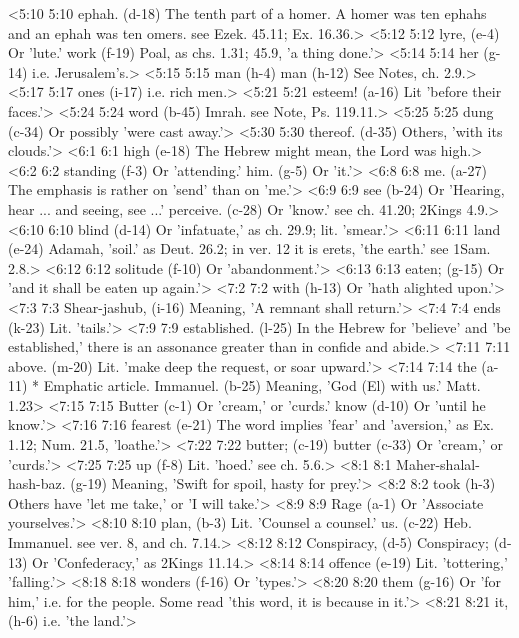<5:10 5:10  ephah. (d-18)  The tenth part of a homer. A homer was ten ephahs and an  ephah was ten omers. see Ezek. 45.11; Ex. 16.36.>
<5:12 5:12  lyre, (e-4)  Or 'lute.'  work (f-19)  Poal, as chs. 1.31; 45.9, 'a thing done.'>
<5:14 5:14  her (g-14)  i.e. Jerusalem's.>
<5:15 5:15  man (h-4)  man (h-12)
  See Notes, ch. 2.9.>
<5:17 5:17  ones (i-17)  i.e. rich men.>
<5:21 5:21  esteem! (a-16)  Lit 'before their faces.'>
<5:24 5:24  word (b-45)  Imrah. see Note, Ps. 119.11.>
<5:25 5:25  dung (c-34)  Or possibly 'were cast away.'>
<5:30 5:30  thereof. (d-35)  Others, 'with its clouds.'>
<6:1 6:1  high (e-18)  The Hebrew might mean, the Lord was high.>
<6:2 6:2  standing (f-3)  Or 'attending.'
  him. (g-5)  Or 'it.'>
<6:8 6:8  me. (a-27)  The emphasis is rather on 'send' than on 'me.'>
<6:9 6:9  see (b-24)  Or 'Hearing, hear ... and seeing, see ...'
  perceive. (c-28)  Or 'know.' see ch. 41.20; 2Kings 4.9.>
<6:10 6:10  blind (d-14)  Or 'infatuate,' as ch. 29.9; lit. 'smear.'>
<6:11 6:11  land (e-24)  Adamah, 'soil.' as Deut. 26.2; in ver. 12 it is erets,  'the earth.' see 1Sam. 2.8.>
<6:12 6:12  solitude (f-10)  Or 'abandonment.'>
<6:13 6:13  eaten; (g-15)  Or 'and it shall be eaten up again.'>
<7:2 7:2  with (h-13)  Or 'hath alighted upon.'>
<7:3 7:3  Shear-jashub, (i-16)  Meaning, 'A remnant shall return.'>
<7:4 7:4  ends (k-23)  Lit. 'tails.'>
<7:9 7:9  established. (l-25)  In the Hebrew for 'believe' and 'be established,' there is an  assonance greater than in confide and abide.>
<7:11 7:11  above. (m-20)  Lit. 'make deep the request, or soar upward.'>
<7:14 7:14  the (a-11)  * Emphatic article.
  Immanuel. (b-25)  Meaning, 'God (El) with us.' Matt. 1.23>
<7:15 7:15  Butter (c-1)  Or 'cream,' or 'curds.'
  know (d-10)  Or 'until he know.'>
<7:16 7:16  fearest (e-21)  The word implies 'fear' and 'aversion,' as Ex. 1.12; Num.  21.5, 'loathe.'>
<7:22 7:22  butter; (c-19)  butter (c-33)
  Or 'cream,' or 'curds.'>
<7:25 7:25  up (f-8)  Lit. 'hoed.' see ch. 5.6.>
<8:1 8:1  Maher-shalal-hash-baz. (g-19)  Meaning, 'Swift for spoil, hasty for prey.'>
<8:2 8:2  took (h-3)  Others have 'let me take,' or 'I will take.'>
<8:9 8:9  Rage (a-1)  Or 'Associate yourselves.'>
<8:10 8:10  plan, (b-3)  Lit. 'Counsel a counsel.'
  us. (c-22)  Heb. Immanuel. see ver. 8, and ch. 7.14.>
<8:12 8:12  Conspiracy, (d-5)  Conspiracy; (d-13)
  Or 'Confederacy,' as 2Kings 11.14.>
<8:14 8:14  offence (e-19)  Lit. 'tottering,' 'falling.'>
<8:18 8:18  wonders (f-16)  Or 'types.'>
<8:20 8:20  them (g-16)  Or 'for him,' i.e. for the people. Some read 'this word, it  is because in it.'>
<8:21 8:21  it, (h-6)  i.e. 'the land.'>
